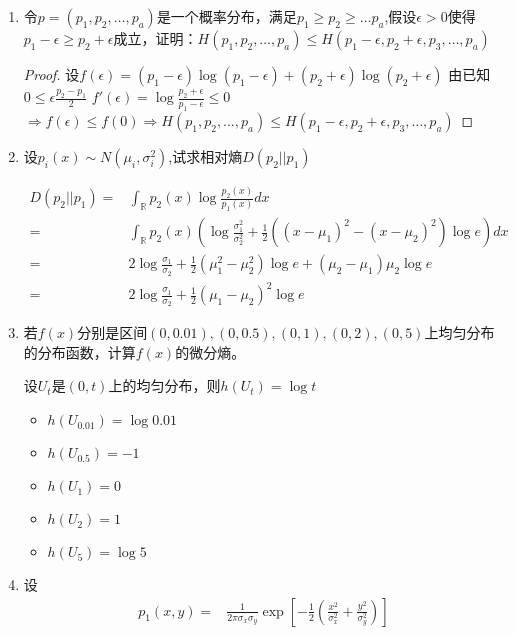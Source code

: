 \documentclass[a4paper]{article}
\begin{document}
\begin{enumerate}
\begin{proof}
\begin{align*}
+&(H(Y)+H(Z)-H(Y,Z))+(H(Z)+H(X)-H(X,Z))\\
=& H(X,Y,Z)-H(X)-H(Y)-H(Z)+I(X;Y)+I(Y;Z)+I(Z;X)
\end{align*}
\end{proof}
\item 令$p=(p_1,p_2,\dots,p_a)$是一个概率分布，满足$p_1\geq p_2\geq \dots p_a$,假设$\epsilon >0 $使得$p_1-\epsilon \geq p_2+\epsilon$成立，证明：$H(p_1,p_2,\dots,p_a)
\leq H(p_1-\epsilon,p_2+\epsilon,p_3,\dots,p_a)$
\begin{proof}
设$f(\epsilon)=(p_1-\epsilon)\log(p_1-\epsilon)+(p_2+\epsilon)\log(p_2+\epsilon)$
由已知$0\leq \epsilon \frac{p_2-p_1}{2}$
$f'(\epsilon)=\log\frac{p_2+\epsilon}{p_1-\epsilon}\leq 0$
$\Rightarrow f(\epsilon)\leq f(0)\Rightarrow H(p_1,p_2,\dots,p_a)\leq H(p_1-\epsilon,p_2+\epsilon,p_3,\dots,p_a)$
\end{proof}
\item 设$p_i(x)\sim N(\mu_i,\sigma_i^2)$,试求相对熵$D(p_2||p_1)$
\begin{solution}
\begin{align*}
D(p_2||p_1)=& \int_{\mathbb{R}} p_2(x) \log \frac{p_2(x)}{p_1(x)}dx\\
=& \int_{\mathbb{R}} p_2(x) \left(\log \frac{\sigma_1^2}{\sigma_2^2}+\frac{1}{2}((x-\mu_1)^2-(x-\mu_2)^2)\log e\right)dx\\
=& 2\log \frac{\sigma_1}{\sigma_2}+\frac{1}{2}(\mu_1^2-\mu_2^2)\log e+(\mu_2-\mu_1)\mu_2\log e\\
=& 2\log \frac{\sigma_1}{\sigma_2}+\frac{1}{2}(\mu_1-\mu_2)^2\log e
\end{align*}
\end{solution}
\item 若$f(x)$分别是区间$(0,0.01),(0,0.5),(0,1),(0,2),(0,5)$上均匀分布的分布函数，计算$f(x)$的微分熵。
\begin{solution}
设$U_t$是$(0,t)$上的均匀分布，则$h(U_t)=\log t$
\begin{itemize}
\item $h(U_{0.01})=\log 0.01$
\item $h(U_{0.5})=-1$
\item $h(U_{1})=0$
\item $h(U_{2})=1$
\item $h(U_{5})=\log 5$
\end{itemize}
\end{solution}
\item 设
\begin{align*}
p_1(x,y)=& \frac{1}{2\pi \sigma_x\sigma_y}\exp[-\frac{1}{2}(\frac{x^2}{\sigma_x^2}+\frac{y^2}{\sigma_y^2})]\\

\end{align*}
\end{enumerate}
\end{document}
